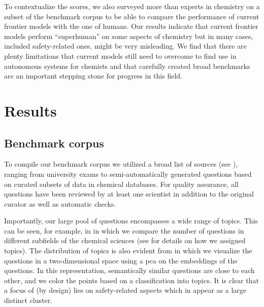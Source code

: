 \documentclass[11pt, oneside]{article}
\begin{document}
\begin{refsection}
To contextualize the scores, we also surveyed more than  experts in chemistry on a subset of the benchmark corpus to be able to compare the performance of current frontier models with the one of humans.
Our results indicate that current frontier models perform \enquote{superhuman} on some aspects of chemistry but in many cases, included safety-related ones, might be very misleading.
We find that there are plenty limitations that current models still need to overcome to find use in autonomous systems for chemists and that carefully created broad benchmarks are an important stepping stone for progress in this field.  %

\section{Results}

\subsection{Benchmark corpus}

To compile our benchmark corpus we utilized a broad list of sources (see ), ranging from university exams to semi-automatically generated questions based on curated subsets of data in chemical databases.
For quality assurance, all questions have been reviewed by at least one scientist in addition to the original curator as well as automatic checks. 

Importantly, our large pool of questions encompasses a wide range of topics.
This can be seen, for example, in  in which we compare the number of questions in different subfields of the chemical sciences (see  for details on how we assigned topics).
The distribution of topics is also evident from  in which we visualize the questions in a two-dimensional space using a \gls{pca} on the embeddings of the questions.
In this representation, semantically similar questions are close to each other, and we color the points based on a classification into  topics. 
It is clear that a focus of \chembench (by design) lies on safety-related aspects which in  appear as a large distinct cluster.



\end{refsection}
\end{document}

